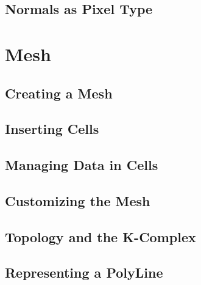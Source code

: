 %



\subsection{Normals as Pixel Type}
\label{sec:PointSetWithCovariantVectorsAsPixelType}

%




\section{Mesh}\label{MeshSection}

\subsection{Creating a Mesh}
\label{sec:CreatingAMesh}

%


\subsection{Inserting Cells}
\label{sec:InsertingCellsInMesh}

%


\subsection{Managing Data in Cells}
\label{sec:ManagingCellDataInMesh}

%


\subsection{Customizing the Mesh}
\label{sec:CustomizingTheMesh}

%


\subsection{Topology and the K-Complex}
\label{sec:MeshKComplex}

%


\subsection{Representing a PolyLine}
\label{sec:MeshPolyLine}

